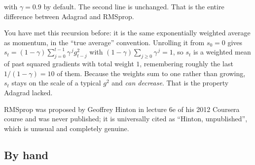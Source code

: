 \documentclass[11pt]{article}
\begin{document}
with $\gamma = 0.9$ by default. The second line is unchanged. That is the
entire difference between Adagrad and RMSprop.

You have met this recursion before: it is the same exponentially weighted
average as momentum, in the ``true average'' convention. Unrolling it from
$s_0 = 0$ gives
$s_t = (1-\gamma)\sum_{j=0}^{t-1} \gamma^{\,j} g_{t-j}^2$ with
$(1-\gamma)\sum_{j\ge0}\gamma^{\,j} = 1$, so $s_t$ is a weighted mean of past
squared gradients with total weight $1$, remembering roughly the last
$1/(1-\gamma) = 10$ of them. Because the weights sum to one rather than
growing, $s_t$ stays on the scale of a typical $g^2$ and \emph{can decrease}.
That is the property Adagrad lacked.

RMSprop was proposed by Geoffrey Hinton in lecture 6e of his 2012 Coursera
course and was never published; it is universally cited as ``Hinton,
unpublished'', which is unusual and completely genuine.

\subsection{By hand}
\end{document}
